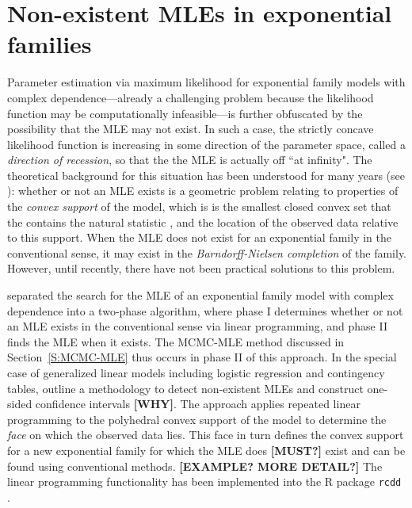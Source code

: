 \section{Non-existent MLEs in exponential families} \label{S:Non-existent MLE}
Parameter estimation via maximum likelihood for exponential family models with 
complex dependence---already a 
challenging problem because the likelihood function may be computationally 
infeasible---is further obfuscated by the possibility that the MLE
may not exist.  
In such a case, the strictly concave likelihood function is
increasing in some direction of the parameter space, called a 
\emph{direction of recession}, so that the the MLE is actually off ``at infinity".
The theoretical background 
for this situation has been understood for many years 
(see \citep{Barndorff,Brown:1986}): whether or not an MLE exists is a
geometric problem relating to properties of the \emph{convex support} of the model,
which is  is the smallest closed convex set 
that the contains the natural statistic \citep{Geyer:gdor},
and the location of the observed data relative to this support.
When the MLE does not exist for
an exponential family in the conventional sense, 
it may exist in the \emph{Barndorff-Nielsen completion} of the family.
However, until recently, there have not been practical solutions to this problem.

\citet{Geyer:1992} separated the search for the MLE of an exponential family model
with complex dependence into a two-phase algorithm, 
where phase I determines whether or not an MLE exists in the conventional 
sense via linear programming, and phase II finds the MLE when it exists.
The MCMC-MLE method discussed in Section~\ref{S:MCMC-MLE} thus occurs in phase II of
this approach.
In the special case of generalized linear models including logistic regression and contingency 
tables, \citet{Geyer:gdor} outline a methodology to detect non-existent MLEs and construct 
one-sided confidence intervals \textbf{[WHY]}.
The approach applies repeated linear programming to the polyhedral convex support of 
the model to determine the \emph{face} on which the observed data lies.  
This face in turn defines the convex support for a new exponential family for which the MLE 
does \textbf{[MUST?]} exist and can be found using conventional methods.  \textbf{[EXAMPLE? MORE DETAIL?]}
The linear programming 
functionality has been implemented into the R package \texttt{rcdd} \citep*{rcdd}.  

